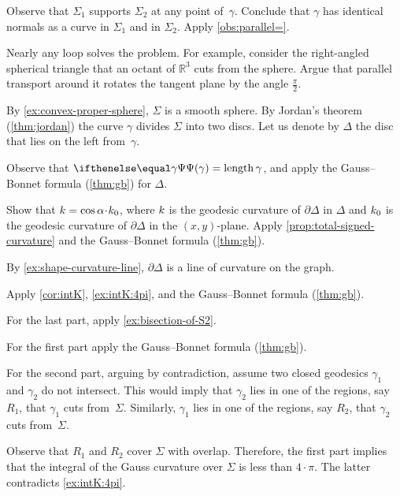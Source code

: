 \setcounter{eqtn}{0}

Observe that $\Sigma_1$ supports $\Sigma_2$ at any point of~$\gamma$.
Conclude that $\gamma$ has identical normals as a curve in $\Sigma_1$ and in $\Sigma_2$.
Apply \ref{obs:parallel=}.

Nearly any loop solves the problem.
For example, consider the right-angled spherical triangle that an octant of $\mathbb{R}^3$ cuts from the sphere.
Argue that parallel transport around it rotates the tangent plane by the angle $\tfrac\pi 2$. 

\setcounter{eqtn}{0}

By \ref{ex:convex-proper-sphere}, $\Sigma$ is a smooth sphere.
By Jordan's theorem (\ref{thm:jordan}) the curve $\gamma$ divides $\Sigma$ into two discs.
Let us denote by $\Delta$ the disc that lies on the left from~$\gamma$.

Observe that $\tgc\gamma=\length\gamma$, and apply the Gauss--Bonnet formula (\ref{thm:gb}) for $\Delta$.

Show that $\skur=\cos\alpha\cdot\skur_0$,
where $k$ is the geodesic curvature of $\partial \Delta$ in $\Delta$
and $k_0$ is the geodesic curvature of $\partial \Delta$ in the $(x,y)$-plane.
Apply \ref{prop:total-signed-curvature} and the Gauss--Bonnet formula (\ref{thm:gb}).

By \ref{ex:shape-curvature-line}, $\partial\Delta$ is a line of curvature on the graph.

Apply \ref{cor:intK}, \ref{ex:intK:4pi}, and the Gauss--Bonnet formula (\ref{thm:gb}).

For the last part, apply \ref{ex:bisection-of-S2}.

 For the first part apply the Gauss--Bonnet formula (\ref{thm:gb}).

For the second part, arguing by contradiction, assume two closed geodesics $\gamma_1$ and $\gamma_2$ do not intersect. 
This would imply that $\gamma_2$ lies in one of the regions, say $R_1$, that $\gamma_1$ cuts from~$\Sigma$.
Similarly, $\gamma_1$ lies in one of the regions, say $R_2$, that $\gamma_2$ cuts from~$\Sigma$.

Observe that $R_1$ and $R_2$ cover $\Sigma$ with overlap.
Therefore, the first part implies that the integral of the Gauss curvature over $\Sigma$ is less than $4\cdot\pi$.
The latter contradicts \ref{ex:intK:4pi}.

